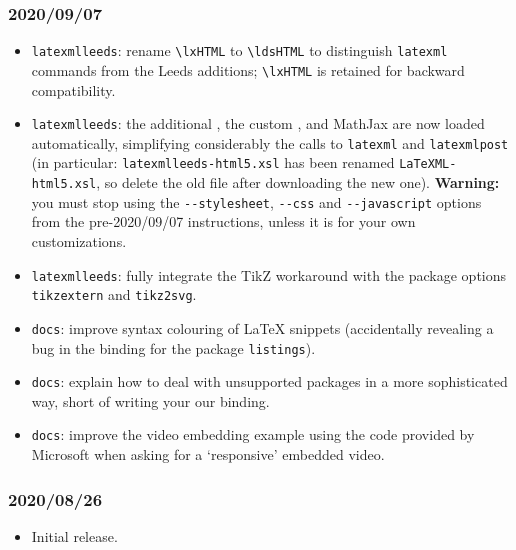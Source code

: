 \documentclass[a4paper]{article}
\def\ltxinline{\lstinline[style=latexml,frame=none]}
\theoremstyle{definition}
\begin{document}
\subsubsection*{2020/09/07}
\begin{itemize}
  \item \verb|latexmlleeds|: rename \ltxinline|\lxHTML| to \ltxinline|\ldsHTML| to distinguish \verb|latexml| commands from the Leeds additions; \ltxinline|\lxHTML| is retained for backward compatibility.
  \item \verb|latexmlleeds|: the additional \CSS{}, the custom \XSLT{}, and MathJax are now loaded automatically, simplifying considerably the calls to \verb|latexml| and \verb|latexmlpost| (in particular: \verb|latexmlleeds-html5.xsl| has been renamed \verb|LaTeXML-html5.xsl|, so delete the old file after downloading the new one). \textbf{Warning:} you must stop using the \verb|--stylesheet|, \verb|--css| and \verb|--javascript| options from the pre-2020/09/07 instructions, unless it is for your own customizations.
  \item \verb|latexmlleeds|: fully integrate the TikZ workaround with the package options \verb|tikzextern| and \verb|tikz2svg|.
  \item \verb|docs|: improve syntax colouring of \LaTeX{} snippets (accidentally revealing a bug in the \LaTeXML{} binding for the package \verb|listings|).
  \item \verb|docs|: explain how to deal with unsupported packages in a more sophisticated way, short of writing your our \LaTeXML{} binding.
  \item \verb|docs|: improve the video embedding example using the code provided by Microsoft when asking for a `responsive' embedded video.
\end{itemize}
\subsubsection*{2020/08/26}
\begin{itemize}
  \item Initial release.
\end{itemize}
\end{document}
